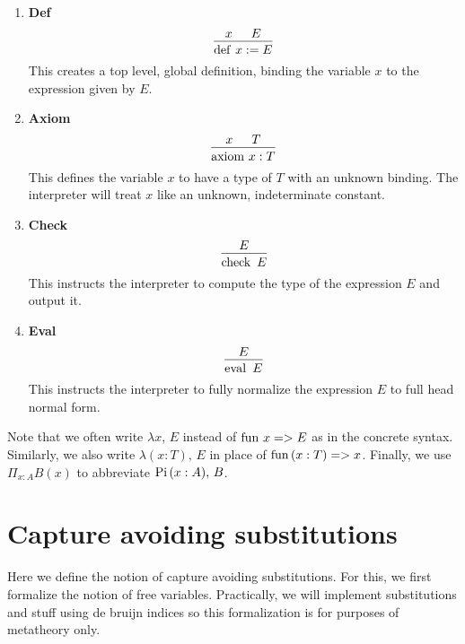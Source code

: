 \documentclass{article}
\begin{document}
\begin{enumerate}
\item \textbf{Def} \\
\[
  \begin{prooftree}
    \hypo{x}
    \hypo{E}
    \infer2{\deff \, x := E}
  \end{prooftree}
\]
This creates a top level, global definition, binding the variable $x$ to the
expression given by $E$.

\item \textbf{Axiom} \\
\[
  \begin{prooftree}
    \hypo{x}
    \hypo{T}
    \infer2{\axiom \, x : T}
  \end{prooftree}
\]
This defines the variable $x$ to have a type of $T$ with an unknown binding.
The interpreter will treat $x$ like an unknown, indeterminate constant.

\item \textbf{Check} \\
\[
  \begin{prooftree}
    \hypo{E}
    \infer1{\checkk \,\, E}
  \end{prooftree}
\]
This instructs the interpreter to compute the type of the expression $E$ and
output it.

\item \textbf{Eval} \\
\[
  \begin{prooftree}
    \hypo{E}
    \infer1{\evall \,\, E}
  \end{prooftree}
\]
This instructs the interpreter to fully normalize the expression $E$ to full
head normal form.

\end{enumerate}

Note that we often write $\lambda x, \, E$ instead of $\operatorname{fun} \, x => E$ as in the
concrete syntax. Similarly, we also write $\lambda (x : T), \, E$ in place of
$\operatorname{fun} \, (x : T) => x$.
Finally, we use $\Pi_{x : A}B(x)$ to abbreviate $\operatorname{Pi} \, (x : A), \, B$.

\section{Capture avoiding substitutions}
Here we define the notion of capture avoiding substitutions. For this, we first
formalize the notion of free variables.
Practically, we will implement substitutions and stuff using de bruijn indices
so this formalization is for purposes of metatheory only.
\end{document}
